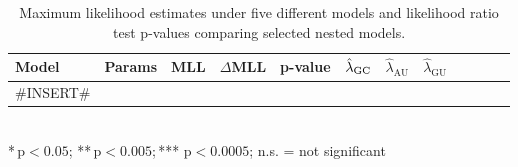 \documentclass[12pt]{article}
\begin{document}
	
\begin{landscape}
	\begin{table}		
		\captionsetup{justification=centering}
		\caption{\label{tab:lrt} Maximum likelihood estimates under five different models and likelihood ratio test p-values comparing selected nested models.}
		\centering
		\begin{tabular}{lcclcccccccc}
			\toprule 
			Model & Params & MLL & \multicolumn{1}{c}{$\Delta$MLL} & p-value & $\hat{\lambda}_{\text{\text{GC}}}$ & $\hat{\lambda}_{\text{AU}}$ & $\hat{\lambda}_{\text{GU}}$ \\
			\midrule			
#INSERT#																			
			\bottomrule
		\end{tabular}
		{\\*\,$\text{p} < 0.05$;\; **\,$\text{p} < 0.005$;\;\,*** $\text{p} < 0.0005$;\; n.s. = not significant}
	\end{table}
\end{landscape}
\end{document}

